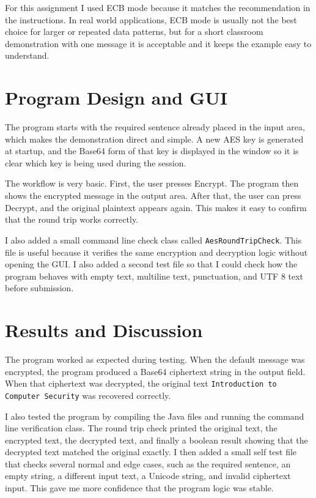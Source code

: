 \documentclass[12pt,a4paper]{article}
\begin{document}
For this assignment I used ECB mode because it matches the recommendation in the instructions. In real world applications, ECB mode is usually not the best choice for larger or repeated data patterns, but for a short classroom demonstration with one message it is acceptable and it keeps the example easy to understand.

\section{Program Design and GUI}
The program starts with the required sentence already placed in the input area, which makes the demonstration direct and simple. A new AES key is generated at startup, and the Base64 form of that key is displayed in the window so it is clear which key is being used during the session.

The workflow is very basic. First, the user presses Encrypt. The program then shows the encrypted message in the output area. After that, the user can press Decrypt, and the original plaintext appears again. This makes it easy to confirm that the round trip works correctly.

I also added a small command line check class called \texttt{AesRoundTripCheck}. This file is useful because it verifies the same encryption and decryption logic without opening the GUI. I also added a second test file so that I could check how the program behaves with empty text, multiline text, punctuation, and UTF 8 text before submission.

\section{Results and Discussion}
The program worked as expected during testing. When the default message was encrypted, the program produced a Base64 ciphertext string in the output field. When that ciphertext was decrypted, the original text \texttt{Introduction to Computer Security} was recovered correctly.

I also tested the program by compiling the Java files and running the command line verification class. The round trip check printed the original text, the encrypted text, the decrypted text, and finally a boolean result showing that the decrypted text matched the original exactly. I then added a small self test file that checks several normal and edge cases, such as the required sentence, an empty string, a different input text, a Unicode string, and invalid ciphertext input. This gave me more confidence that the program logic was stable.
\end{document}
